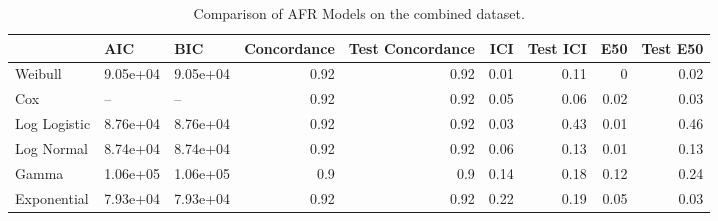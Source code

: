 \begin{table*}
\centering
\caption{Comparison of AFR Models on the combined dataset.}
\label{tab:combined}
\begin{tabular}{lllrrrrrr}
\toprule
 & AIC & BIC & Concordance & Test Concordance & ICI & Test ICI & E50 & Test E50 \\
\midrule
Weibull & 9.05e+04 & 9.05e+04 & 0.92 & 0.92 & 0.01 & 0.11 & 0 & 0.02 \\
Cox & -- & -- & 0.92 & 0.92 & 0.05 & 0.06 & 0.02 & 0.03 \\
Log Logistic & 8.76e+04 & 8.76e+04 & 0.92 & 0.92 & 0.03 & 0.43 & 0.01 & 0.46 \\
Log Normal & 8.74e+04 & 8.74e+04 & 0.92 & 0.92 & 0.06 & 0.13 & 0.01 & 0.13 \\
Gamma & 1.06e+05 & 1.06e+05 & 0.9 & 0.9 & 0.14 & 0.18 & 0.12 & 0.24 \\
Exponential & 7.93e+04 & 7.93e+04 & 0.92 & 0.92 & 0.22 & 0.19 & 0.05 & 0.03 \\
\bottomrule
\end{tabular}
\end{table*}
